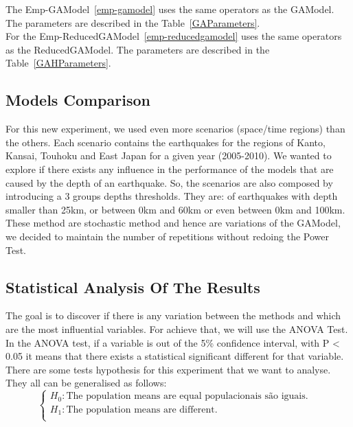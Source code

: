 The Emp-GAModel~\ref{emp-gamodel} uses the same operators as the GAModel. The parameters are described in the Table~\ref{GAParameters}.\\

For the Emp-ReducedGAModel~\ref{emp-reducedgamodel} uses the same operators as the ReducedGAModel. The parameters are described in the Table~\ref{GAHParameters}.\\


\subsection{Models Comparison}
For this new experiment, we used even more scenarios (space/time regions) than the others. Each scenario contains the earthquakes for the regions of Kanto, Kansai, Touhoku and East Japan for a given year (2005-2010). We wanted to explore if there exists any influence in the performance of the models that are caused by the depth of an earthquake. So, the scenarios are also composed by introducing a 3 groups depths thresholds. They are: of earthquakes with depth smaller than 25km, or between 0km and 60km or even between 0km and 100km.\\

These method are stochastic method and hence are variations of the GAModel, we decided to maintain the number of repetitions without redoing the Power Test.\\

\subsection{Statistical Analysis Of The Results}

The goal is to discover if there is any variation between the methods and which are the most influential variables. For achieve that, we will use the ANOVA Test.\\

In the ANOVA test, if a variable is out of the 5\% confidence interval, with P < 0.05 it means that there exists a statistical significant different for that variable.\\

There are some tests hypothesis for this experiment that we want to analyse. They all can be generalised as follows:\\

$$\begin{cases} H_0: \text{The population means are equal populacionais são iguais.} &\\
H_1: \text{The population means are different.}&\\
\end{cases}$$\\

